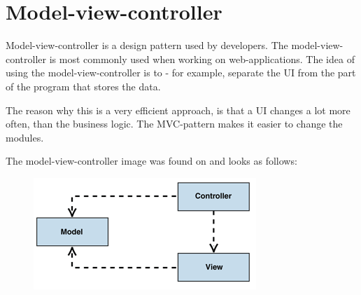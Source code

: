 \section{Model-view-controller}


Model-view-controller is a design pattern used by developers\cite{mvcasp}. The 
model-view-controller is most commonly used when working on web-applications\cite{mvcasp}. 
The idea of using the model-view-controller is to - for example, separate the UI from the 
part of the program that stores the data\cite{modelviewcontroller}. 

The reason why this is a very efficient approach, is that a UI changes a lot more often, 
than the business logic\cite{modelviewcontroller}. The MVC-pattern makes it easier to change 
the modules\cite{modelviewcontroller}.

The model-view-controller image was found on\cite{modelviewcontroller} and looks as follows:

\begin{figure}[ht]
	\centering
		\includegraphics{design/figures/model-view-controller.png}
	\label{fig:model-view-controller}
\end{figure}



